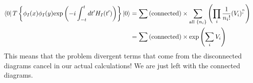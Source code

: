 \documentclass[11pt]{article}
\numberwithin{equation}{section}
\begin{document}
\begin{itemize}
  \begin{align*}
    \bra{0}T\left\{\phi_I(x)\phi_I(y)\text{exp}\left(-i\int_{-t}^{t}dt'H_{I}(t')\right)\right\}\ket{0} &= \sum\left(\text{connected}\right) \times \sum_{\text{all }\{n_i\}} \left(\prod_{i}\frac{1}{n_i!}(V_i)^{^n_{i}} \right)  \\
    & = \sum\left(\text{connected}\right)\times \exp\left(\sum_{i}V_i\right)
  \end{align*}
  This means that the problem divergent terms that come from the disconnected diagrams cancel in our actual calculations! We are just left with the connected diagrams.   

\end{itemize}






\end{document}
